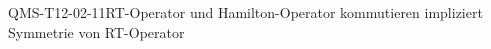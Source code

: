 
\begin{CONC}{QMS-T12-02-11}{RT-Operator und Hamilton-Operator kommutieren impliziert Symmetrie von RT-Operator}
\end{CONC}
